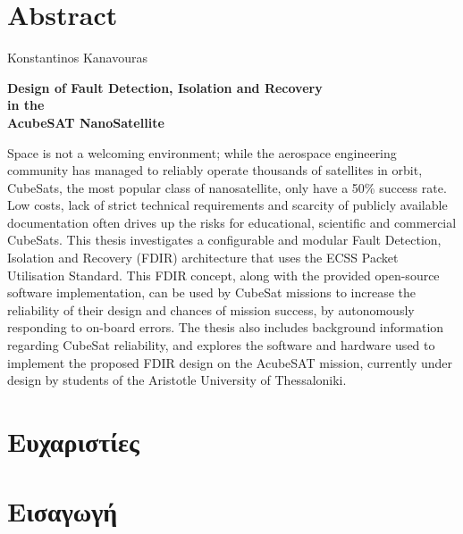 \documentclass[a4paper,nobib]{tufte-book}
\begin{document}
\chapter*{Abstract}

\begin{center}
	\large Konstantinos Kanavouras
	\par
	\vspace{2ex}
	\Large\textbf{Design of Fault Detection, Isolation and Recovery}\\
	\large\textbf{in the}\\
	\Large\textbf{AcubeSAT NanoSatellite}\par
\end{center}

\justify
Space is not a welcoming environment; while the aerospace engineering community has managed to reliably operate thousands of satellites in orbit, CubeSats, the most popular class of nanosatellite, only have a 50\% success rate. Low costs, lack of strict technical requirements and scarcity of publicly available documentation often drives up the risks for educational, scientific and commercial CubeSats. This thesis investigates a configurable and modular Fault Detection, Isolation and Recovery (FDIR) architecture that uses the ECSS Packet Utilisation Standard. This FDIR concept, along with the provided open-source software implementation, can be used by CubeSat missions to increase the reliability of their design and chances of mission success, by autonomously responding to on-board errors. The thesis also includes background information regarding CubeSat reliability, and explores the software and hardware used to implement the proposed FDIR design on the AcubeSAT mission, currently under design by students of the Aristotle University of Thessaloniki.

\chapter*{Ευχαριστίες}

\mainmatter


\chapter{Εισαγωγή}
\end{document}
